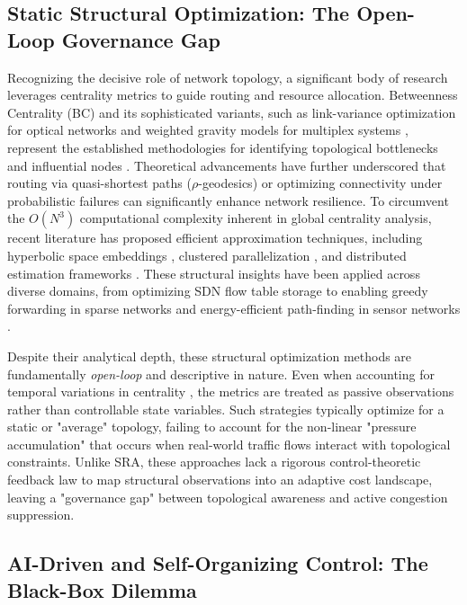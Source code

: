 \documentclass{ccjnl}
\begin{document}
\subsection{Static Structural Optimization: The Open-Loop Governance Gap}

Recognizing the decisive role of network topology, a significant body of research leverages centrality metrics to guide routing and resource allocation. Betweenness Centrality (BC) and its sophisticated variants, such as link-variance optimization for optical networks \cite{Upadhyay2024OpticalBC} and weighted gravity models for multiplex systems \cite{Ni2023Gravity}, represent the established methodologies for identifying topological bottlenecks and influential nodes \cite{Basaras2019Influential, Wehmuth2021SpuriousPaths}. Theoretical advancements have further underscored that routing via quasi-shortest paths ($\rho$-geodesics) \cite{DeMedeiros2017QuasiShortest} or optimizing connectivity under probabilistic failures \cite{Cavallaro2022Connectivity} can significantly enhance network resilience. To circumvent the $O(N^3)$ computational complexity inherent in global centrality analysis, recent literature has proposed efficient approximation techniques, including hyperbolic space embeddings \cite{Stai2017Hyperbolic}, clustered parallelization \cite{Suppa2015FastBC}, and distributed estimation frameworks \cite{Maccari2020DistributedLoad, Maccari2018DistributedDV}. These structural insights have been applied across diverse domains, from optimizing SDN flow table storage \cite{Ma2019FlowTable} to enabling greedy forwarding in sparse networks \cite{Ahmed2025SparseNet} and energy-efficient path-finding in sensor networks \cite{Oliveira2010WSNcentrality}.

Despite their analytical depth, these structural optimization methods are fundamentally \textit{open-loop} and descriptive in nature. Even when accounting for temporal variations in centrality \cite{Ghanem2019DynamicCentrality}, the metrics are treated as passive observations rather than controllable state variables. Such strategies typically optimize for a static or "average" topology, failing to account for the non-linear "pressure accumulation" that occurs when real-world traffic flows interact with topological constraints. Unlike SRA, these approaches lack a rigorous control-theoretic feedback law to map structural observations into an adaptive cost landscape, leaving a "governance gap" between topological awareness and active congestion suppression.

\subsection{AI-Driven and Self-Organizing Control: The Black-Box Dilemma}
\end{document}
